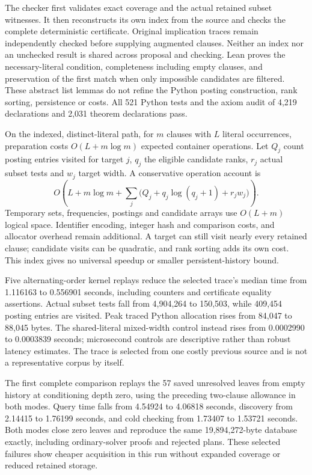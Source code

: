 \documentclass[11pt,a4paper]{article}
\numberwithin{equation}{section}
\theoremstyle{plain}
\theoremstyle{definition}
\theoremstyle{remark}
\begin{document}
The checker first validates exact coverage and the actual retained subset witnesses. It then reconstructs its own index from the source and checks the complete deterministic certificate. Original implication traces remain independently checked before supplying augmented clauses. Neither an index nor an unchecked result is shared across proposal and checking. Lean proves the necessary-literal condition, completeness including empty clauses, and preservation of the first match when only impossible candidates are filtered. These abstract list lemmas do not refine the Python posting construction, rank sorting, persistence or costs. All 521 Python tests and the axiom audit of 4,219 declarations and 2,031 theorem declarations pass.

On the indexed, distinct-literal path, for $m$ clauses with $L$ literal occurrences, preparation costs $O(L+m\log m)$ expected container operations. Let $Q_j$ count posting entries visited for target $j$, $q_j$ the eligible candidate ranks, $r_j$ actual subset tests and $w_j$ target width. A conservative operation account is
\[
 O\!\left(L+m\log m+\sum_j\bigl(Q_j+q_j\log(q_j+1)+r_jw_j\bigr)\right).
\]
Temporary sets, frequencies, postings and candidate arrays use $O(L+m)$ logical space. Identifier encoding, integer hash and comparison costs, and allocator overhead remain additional. A target can still visit nearly every retained clause; candidate visits can be quadratic, and rank sorting adds its own cost. This index gives no universal speedup or smaller persistent-history bound.

Five alternating-order kernel replays reduce the selected trace's median time from 1.116163 to 0.556901 seconds, including counters and certificate equality assertions. Actual subset tests fall from 4,904,264 to 150,503, while 409,454 posting entries are visited. Peak traced Python allocation rises from 84,047 to 88,045 bytes. The shared-literal mixed-width control instead rises from 0.0002990 to 0.0003839 seconds; microsecond controls are descriptive rather than robust latency estimates. The trace is selected from one costly previous source and is not a representative corpus by itself.

The first complete comparison replays the 57 saved unresolved leaves from empty history at conditioning depth zero, using the preceding two-clause allowance in both modes. Query time falls from 4.54924 to 4.06818 seconds, discovery from 2.14415 to 1.76199 seconds, and cold checking from 1.73407 to 1.53721 seconds. Both modes close zero leaves and reproduce the same 19,894,272-byte database exactly, including ordinary-solver proofs and rejected plans. These selected failures show cheaper acquisition in this run without expanded coverage or reduced retained storage.
\end{document}
